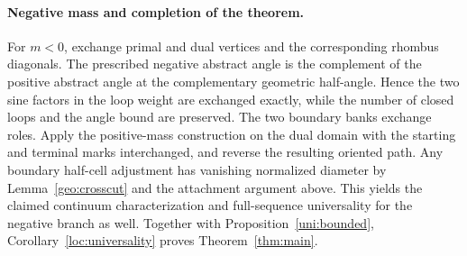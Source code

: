 \paragraph{Negative mass and completion of the theorem.}
For \(m<0\), exchange primal and dual vertices and
the corresponding rhombus diagonals. The prescribed
negative abstract angle is the complement of the
positive abstract angle at the complementary
geometric half-angle. Hence the two sine factors
in the loop weight are exchanged exactly, while
the number of closed loops and the angle bound
are preserved. The two boundary banks exchange
roles. Apply the positive-mass construction on
the dual domain with the starting and terminal
marks interchanged, and reverse the resulting
oriented path. Any boundary half-cell adjustment
has vanishing normalized diameter by
Lemma~\ref{geo:crosscut} and the attachment
argument above. This yields the claimed
continuum characterization and full-sequence
universality for the negative branch as well.
Together with Proposition~\ref{uni:bounded},
Corollary~\ref{loc:universality} proves
Theorem~\ref{thm:main}.
